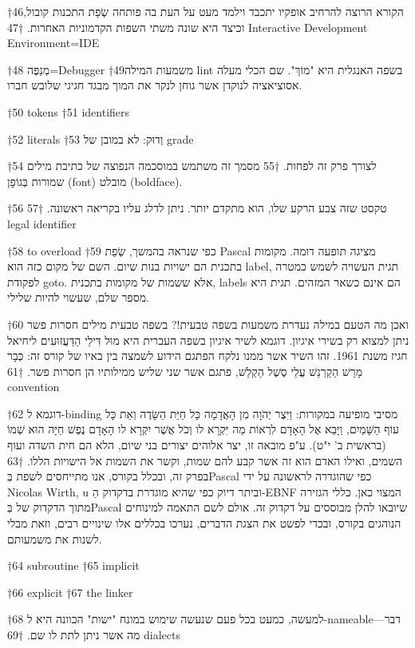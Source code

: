 \begin{טבלא}[!htbp]
†{46}הקורא הרוצה להרחיב אופקיו יתכבד וילמד מעט על העת בה פותחה שְׂפַת התכנות קובול, וכיצד היא שונה משתי השפות הקדמוניות האחרות.
†{47} Interactive Development Environment=IDE

†{48} מְנַפֶּה=Debugger
†{49}משמעות המילה lint בשפה האנגלית היא "מוֹךְ". שם הכלי מעלה אסוציאציה לנוקדן אשר גוחן לנקר את המוך מבגד חגיגי שלובש חברו.

†{50} tokens
†{51} identifiers

†{52} literals
†{53} וְדוּק: לא במובן של grade

†{54} לצורך פרק זה לפחות.
†{55} מסמך זה משתמש במוסכמה הנפוצה של כתיבת מילים שמורות בְּגוֹפָן (font) מובלט (boldface).

†{56} טקסט שזה צבע הרקע שלו, הוא מתקדם יותר. ניתן לדלג עליו בקריאה ראשונה.
†{57} legal identifier

†{58} to overload
†{59} כפי שנראה בהמשך, שְׂפַת Pascal מציגה תופעה דומה. מקומות בתכנית הם ישויות בנות שיום. השם של מקום כזה הוא label, תגית העשויה לשמש כמטרה לפקודת goto. אלא ששמות של מקומות בתכנית, labels הם אינם כשאר המזהים. תגית היא מספר שלם, שעשוי להיות שלילי.

†{60} ואכן מה הטעם במילה נעדרת משמעות בשפה טבעית!? בשפה טבעית מילים חסרות פשר ניתן למצוא רק בשירי איגיון. דוגמא לשיר איגיון בשפה העברית היא מוּל דִּילֵי הַדַּעֲזוּעִים ליחיאל חגיז משנת 1961. זהו השיר אשר ממנו נלקח הפתגם הידוע לשמצה בין באיו של קורס זה: כְּבָר מָרַשׁ הַקַרְנַשׁ עֲלֵי סֶשֶׁל הַקְלַשׁ, פתגם אשר שני שליש ממילותיו הן חסרות פשר.
†{61} convention

†{62} דוגמא ל-binding מסיבי מופיעה במקורות: וַיִּצֶר יְהֹוָה מִן הָאֲדָמָה כָּל חַיַּת הַשָּׂדֶה וְאֵת כָּל עוֹף הַשָּׁמַיִם, וַיָּבֵא אֶל הָאָדָם לִרְאוֹת מַה יִּקְרָא לו וְכֹל אֲשֶׁר יִקְרָא לו הָאָדָם נֶפֶשׁ חַיָּה הוּא שְׁמוֹ (בראשית ב' י"ט). ע"פ מובאה זו, יצר אלוהים יצורים בני שיום, הלא הם חית השדה ועוף השמים, ואילו האדם הוא זה אשר קבע להם שמות, וקשר את השמות אל הישויות הללו.
†{63} בפרק זה, ובכלל בקורס, אנו מתייחסים לשפת בְּPascal כפי שהוגדרה לראשונה על ידי Nicolas Wirth, u וביתר דיוק כפי שהיא מוגדרת בדקדוק הַ-EBNF המצוי כאן. כללי הגזירה מתוך הדקדוק של בְּPascal שיובאו להלן מבוססים על דקדוק זה. אולם לשם התאמה למינוחים הנוהגים בקורס, ובכדי לפשט את הצגת הדברים, נערכו בכללים אלו שינויים רבים, וזאת מבלי לשנות את משמעותם.

†{64} subroutine
†{65} implicit

†{66} explicit
†{67} the linker

†{68} למעשה, כמעט בכל פעם שנעשה שימוש במונח "ישות" הכוונה היא ל-nameable---דבר מה אשר ניתן לתת לו שם.
†{69} dialects


\end{טבלא}
